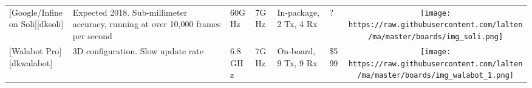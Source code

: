 \begin{longtable}[]{@{}llllllc@{}}
\begin{minipage}[t]{0.09\columnwidth}\raggedright\strut
{[}Google/Infineon Soli{]}{[}dksoli{]}\strut
\end{minipage} & \begin{minipage}[t]{0.13\columnwidth}\raggedright\strut
Expected 2018. Sub-millimeter accuracy, running at over 10,000 frames
per second \cite{Lien2016}\strut
\end{minipage} & \begin{minipage}[t]{0.09\columnwidth}\raggedright\strut
60GHz\strut
\end{minipage} & \begin{minipage}[t]{0.11\columnwidth}\raggedright\strut
7GHz\strut
\end{minipage} & \begin{minipage}[t]{0.10\columnwidth}\raggedright\strut
In-package, 2 Tx, 4 Rx\strut
\end{minipage} & \begin{minipage}[t]{0.15\columnwidth}\raggedright\strut
?\strut
\end{minipage} & \begin{minipage}[t]{0.10\columnwidth}\centering\strut
\texttt{[image: https://raw.githubusercontent.com/lalten/ma/master/boards/img\_soli.png]}\strut
\end{minipage}\tabularnewline
\begin{minipage}[t]{0.09\columnwidth}\raggedright\strut
{[}Walabot Pro{]}{[}dkwalabot{]}\strut
\end{minipage} & \begin{minipage}[t]{0.13\columnwidth}\raggedright\strut
3D configuration. Slow update rate\strut
\end{minipage} & \begin{minipage}[t]{0.09\columnwidth}\raggedright\strut
6.8GHz\strut
\end{minipage} & \begin{minipage}[t]{0.11\columnwidth}\raggedright\strut
7GHz\strut
\end{minipage} & \begin{minipage}[t]{0.10\columnwidth}\raggedright\strut
On-board, 9 Tx, 9 Rx\strut
\end{minipage} & \begin{minipage}[t]{0.15\columnwidth}\raggedright\strut
\$599\strut
\end{minipage} & \begin{minipage}[t]{0.10\columnwidth}\centering\strut
\texttt{[image: https://raw.githubusercontent.com/lalten/ma/master/boards/img\_walabot\_1.png]}\strut

\end{minipage}
\end{longtable}
